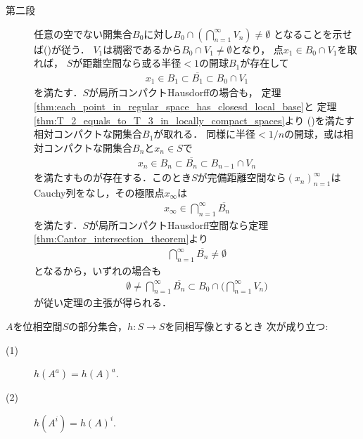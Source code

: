\begin{prf}
\begin{description}
			\item[第二段]
				任意の空でない開集合$B_0$に対し$B_0 \cap \left( \bigcap_{n=1}^\infty V_n \right) \neq \emptyset$
				となることを示せば()が従う．
				$V_1$は稠密であるから$B_0 \cap V_1 \neq \emptyset$となり，
				点$x_1 \in B_0 \cap V_1$を取れば，
				$S$が距離空間なら或る半径$<1$の開球$B_1$が存在して
				\begin{align}
					x_1 \in B_1 \subset \overline{B_1} \subset B_0 \cap V_1
					\label{eq:thm_Baire_category_theorem_2}
				\end{align}
				を満たす．$S$が局所コンパクトHausdorffの場合も，
				定理\ref{thm:each_point_in_regular_space_has_closesd_local_base}と
				定理\ref{thm:T_2_equals_to_T_3_in_locally_compact_spaces}より
				()を満たす
				相対コンパクトな開集合$B_1$が取れる．
				同様に半径$<1/n$の開球，或は相対コンパクトな開集合$B_n$と$x_n \in S$で
				\begin{align}
					x_n \in B_n \subset \overline{B_n} \subset B_{n-1} \cap V_n
				\end{align}
				を満たすものが存在する．このとき$S$が完備距離空間なら$(x_n)_{n=1}^\infty$は
				Cauchy列をなし，その極限点$x_\infty$は
				\begin{align}
					x_\infty \in \bigcap_{n=1}^\infty \overline{B_n}
				\end{align}
				を満たす．$S$が局所コンパクトHausdorff空間なら定理\ref{thm:Cantor_intersection_theorem}より
				\begin{align}
					\bigcap_{n=1}^\infty \overline{B_n} \neq \emptyset
				\end{align}
				となるから，いずれの場合も
				\begin{align}
					\emptyset \neq \bigcap_{n=1}^\infty \overline{B_n} 
					\subset B_0 \cap \Biggl( \bigcap_{n=1}^\infty V_n \Biggr)
				\end{align}
				が従い定理の主張が得られる．
				\QED
		\end{description}
	\end{prf}
	
	\begin{screen}
		\begin{lem}
		\label{lem:image_of_closure_is_closure_of_image}
			$A$を位相空間$S$の部分集合，$h:S \longrightarrow S$を同相写像とするとき
			次が成り立つ:
			\begin{description}
				\item[(1)] $h(A^a) = h(A)^a$.
				\item[(2)] $h(A^i) = h(A)^i$.
			\end{description}
		\end{lem}
	\end{screen}
	
